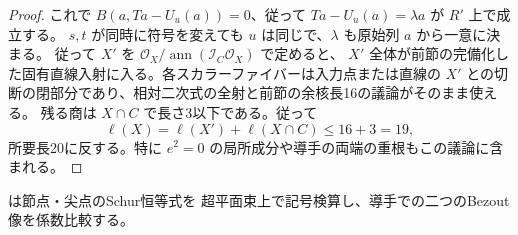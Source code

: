 \begin{proof}
これで $B(a,Ta-U_u(a))=0$、従って $Ta-U_u(a)=\lambda a$ が $R'$ 上で成立する。
$s,t$ が同時に符号を変えても $u$ は同じで、$\lambda$ も原始列 $a$ から一意に決まる。
従って $X'$ を $\mathcal O_X/\operatorname{ann}(\mathcal I_C\mathcal O_X)$ で定めると、
$X'$ 全体が前節の完備化した固有直線入射に入る。各スカラーファイバーは入力点または直線の
$X'$ との切断の閉部分であり、相対二次式の全射と前節の余核長16の議論がそのまま使える。
残る商は $X\cap C$ で長さ3以下である。従って
\[
            \ell(X)=\ell(X')+\ell(X\cap C)\le16+3=19 ,
\]
所要長20に反する。特に $e^2=0$ の局所成分や導手の両端の重根もこの議論に含まれる。
\end{proof}

 は節点・尖点のSchur恒等式を
超平面束上で記号検算し、導手での二つのBezout像を係数比較する。
